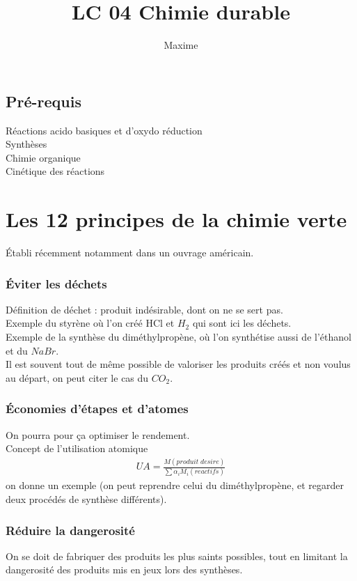 \documentclass[12pt,prb,aps,epsf]{article}
\begin{document}
	
	\title{LC 04 Chimie durable}
	\author{Maxime}
	
	\maketitle
	
	\tableofcontents
	
	\pagebreak
	
	
\subsection{Pré-requis}
Réactions acido basiques et d'oxydo réduction\\
Synthèses\\
Chimie organique\\
Cinétique des réactions

\section{Les 12 principes de la chimie verte}
Établi récemment notamment dans un ouvrage américain.

\subsubsection{Éviter les déchets}
Définition de déchet : produit indésirable, dont on ne se sert pas.\\
Exemple du styrène où l'on créé HCl et $H_2$ qui sont ici les déchets.\\
Exemple de la synthèse du diméthylpropène, où l'on synthétise aussi de l'éthanol et du $NaBr$.\\
Il est souvent tout de même possible de valoriser les produits créés et non voulus au départ, on peut citer le cas du $CO_2$.

\subsubsection{Économies d'étapes et d'atomes}
On pourra pour ça optimiser le rendement.\\
Concept de l'utilisation atomique
\begin{eqnarray}
UA = \frac{M(produit\;desire)}{\sum \alpha_i M_i (reactifs)}
\end{eqnarray}
on donne un exemple (on peut reprendre celui du diméthylpropène, et regarder deux procédés de synthèse différents).

\subsubsection{Réduire la dangerosité}
On se doit de fabriquer des produits les plus saints possibles, tout en limitant la dangerosité des produits mis en jeux lors des synthèses.
\end{document}
